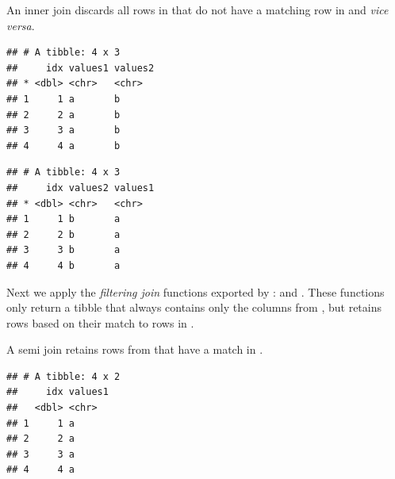 \documentclass[krantz2]{krantz}\usepackage{knitr}
\begin{document}
An inner join discards all rows in  that do not have a matching row in  and \emph{vice versa}.

\begin{knitrout}\footnotesize
{}\color{fgcolor}\begin{kframe}
\begin{alltt}
\hlstd{(}   
\end{alltt}


{\ttfamily\noindent\itshape{}}\begin{verbatim}
## # A tibble: 4 x 3
##     idx values1 values2
## * <dbl> <chr>   <chr>
## 1     1 a       b
## 2     2 a       b
## 3     3 a       b
## 4     4 a       b
\end{verbatim}
\end{kframe}
\end{knitrout}

\begin{knitrout}\footnotesize
{}\color{fgcolor}\begin{kframe}
\begin{alltt}
\hlstd{(}   
\end{alltt}


{\ttfamily\noindent\itshape{}}\begin{verbatim}
## # A tibble: 4 x 3
##     idx values2 values1
## * <dbl> <chr>   <chr>
## 1     1 b       a
## 2     2 b       a
## 3     3 b       a
## 4     4 b       a
\end{verbatim}
\end{kframe}
\end{knitrout}

Next we apply the \emph{filtering join} functions exported by :  and . These functions only return a tibble that always contains only the columns from , but retains rows based on their match to rows in .

A semi join retains rows from  that have a match in .

\begin{knitrout}\footnotesize
{}\color{fgcolor}\begin{kframe}
\begin{alltt}
\hlstd{(}   
\end{alltt}


{\ttfamily\noindent\itshape{}}\begin{verbatim}
## # A tibble: 4 x 2
##     idx values1
##   <dbl> <chr>
## 1     1 a
## 2     2 a
## 3     3 a
## 4     4 a
\end{verbatim}
\end{kframe}
\end{knitrout}
\end{document}
